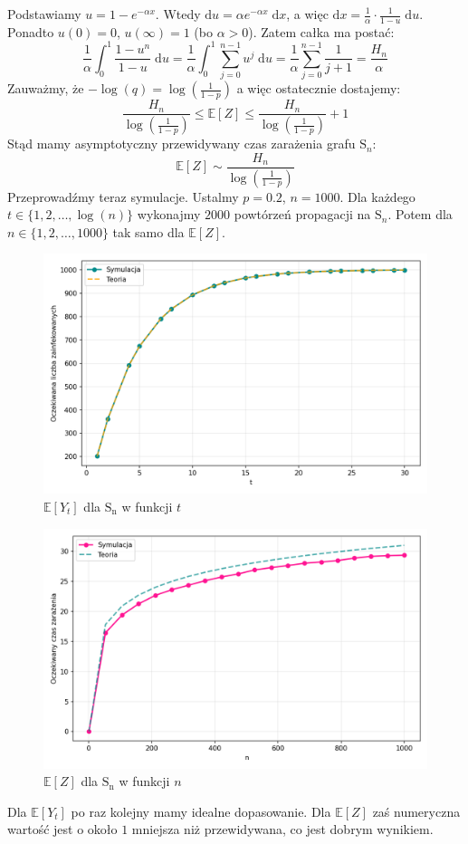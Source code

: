 Podstawiamy $u = 1 - e^{-\alpha x}$. Wtedy $\mathrm{d}u = \alpha e^{-\alpha x} \; \mathrm{d}x$, 
a więc $\mathrm{d}x = \frac{1}{\alpha}\cdot\frac{1}{1-u} \; \mathrm{d}u$. 
Ponadto $u(0) = 0$, $u(\infty) = 1$ (bo $\alpha > 0$). 
Zatem całka ma postać:
\[
 \frac{1}{\alpha} \int_{0}^{1} \frac{1 - u^n}{1 - u} \; \mathrm{d}u
= \frac{1}{\alpha} \int_{0}^{1} \sum_{j=0}^{n-1} u^j \; \mathrm{d}u
= \frac{1}{\alpha} \sum_{j=0}^{n-1} \frac{1}{j+1}
= \frac{H_n}{\alpha}
\]
Zauważmy, że $-\log(q)=\log(\frac{1}{1-p})$ a więc ostatecznie dostajemy:
\[
    \frac{H_n}{\log(\frac{1}{1-p})} \le \mathbb{E}[Z] \le \frac{H_n}{\log(\frac{1}{1-p})} + 1
\]
Stąd mamy asymptotyczny przewidywany czas zarażenia grafu $\mathrm{S}_n$:
\[
    \mathbb{E}[Z] \sim \frac{H_n}{\log(\frac{1}{1-p})}
\]
Przeprowadźmy teraz symulacje. Ustalmy $p=0.2$, $n=1000$. Dla każdego $t\in\{1, 2, \dots, \log(n)\}$ wykonajmy $2000$ powtórzeń propagacji na $\mathrm{S}_n$. Potem dla $n\in\{1,2,\dots,1000\}$ tak samo dla $\mathbb{E}[Z]$. 
\begin{figure}[h!]
    \centering
    \includegraphics[width=1\textwidth]{../img/star/final_infection_expectations.png}
    \caption{$\mathbb{E}[Y_t]$ dla $\mathrm{S_n}$ w funkcji $t$}
\end{figure}
\begin{figure}[h!]
    \centering
    \includegraphics[width=1\textwidth]{../img/star/full_infection_expectation.png}
    \caption{$\mathbb{E}[Z]$ dla $\mathrm{S_n}$ w funkcji $n$}
\end{figure}
Dla $\mathbb{E}[Y_t]$ po raz kolejny mamy idealne dopasowanie. Dla $\mathbb{E}[Z]$ zaś numeryczna wartość jest o około $1$ mniejsza niż przewidywana, co jest dobrym wynikiem.


